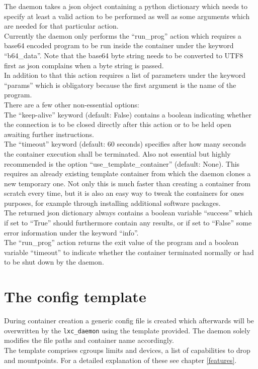 The daemon takes a json object containing a python dictionary which needs to specify at least a valid action to
be performed as well as some arguments which are needed for that particular action.\\
Currently the daemon only performs the ``run\_prog'' action which requires a base64 encoded program to be run
inside the container under the keyword ``b64\_data''. Note that the base64 byte string needs to be converted to
UTF8 first as json complains when a byte string is passed.\\
In addition to that this action requires a list of parameters under the keyword ``params'' which is obligatory
because the first argument is the name of the program.\\
There are a few other non-essential options:\\
The ``keep-alive'' keyword (default: False) contains a boolean indicating whether the connection is to be closed
directly after this action or to be held open awaiting further instructions.\\
The ``timeout'' keyword (default: 60 seconds) specifies after how many seconds the container execution shall be
terminated.
Also not essential but highly recommended is the option ``use\_template\_container'' (default: None). This
requires an already existing template container from which the daemon clones a new temporary one. Not only
this is much faster than creating a container from scratch every time, but it is also an easy way to tweak
the containers for ones purposes, for example through installing additional software packages.\\
The returned json dictionary always contains a boolean variable ``success'' which if set to ``True'' should
furthermore contain any results, or if set to ``False'' some error information under the keyword ``info''.\\
The ``run\_prog'' action returns the exit value of the program and a boolean variable ``timeout'' to indicate
whether the container terminated normally or had to be shut down by the daemon.

\section{The config template}

During container
creation a generic config file is created which afterwards will be overwritten by the \texttt{lxc\_daemon} using
the template provided.
The daemon solely modifies the file paths and container name accordingly.\\
The template comprises cgroups limits and devices, a list of capabilities to drop and mountpoints.
For a detailed explanation of these see chapter \ref{features}.

